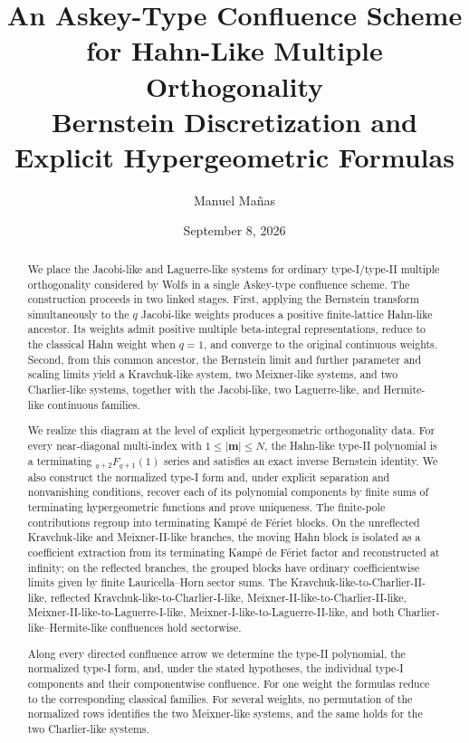 \documentclass[10pt]{amsart}
\title[An Askey-Type Hahn-Like Confluence Scheme]
{An Askey-Type Confluence Scheme for Hahn-Like Multiple Orthogonality\\[0.4ex]
	\mdseries\small Bernstein Discretization and Explicit Hypergeometric Formulas}
\author{Manuel Ma\~nas}
\date{September 8, 2026}
\newcommand{\mm}{\boldsymbol m}
\newcommand{\abs}[1]{\lvert#1\rvert}
\theoremstyle{plain}
\theoremstyle{definition}
\theoremstyle{remark}
\begin{document}
\begin{abstract}
We place the Jacobi-like and Laguerre-like systems for ordinary
type-I/type-II multiple orthogonality considered by Wolfs in a single
Askey-type confluence scheme. The construction proceeds in two linked
stages. First, applying the Bernstein transform simultaneously to the
\(q\) Jacobi-like weights produces a positive finite-lattice Hahn-like
ancestor. Its weights admit positive multiple beta-integral
representations, reduce to the classical Hahn weight when \(q=1\), and
converge to the original continuous weights. Second, from this common
ancestor, the Bernstein limit and further parameter and scaling limits yield a
Kravchuk-like system, two Meixner-like systems, and two Charlier-like
systems, together with the Jacobi-like, two Laguerre-like, and
Hermite-like continuous families.

We realize this diagram at the level of explicit hypergeometric
orthogonality data. For every near-diagonal multi-index with
\(1\le\abs\mm\le N\), the Hahn-like type-II polynomial is a terminating
\({}_{q+2}F_{q+1}(1)\) series and satisfies an exact inverse Bernstein
identity. We also construct the normalized type-I form and, under
explicit separation and nonvanishing conditions, recover each of its
polynomial components by finite sums of terminating hypergeometric
functions and prove uniqueness. The finite-pole contributions regroup
into terminating Kamp\'e de F\'eriet blocks. On the unreflected
Kravchuk-like and Meixner-II-like branches, the moving Hahn block is
isolated as a coefficient extraction from its terminating Kamp\'e de
F\'eriet factor and reconstructed at infinity; on the reflected branches,
the grouped blocks have ordinary coefficientwise limits given by finite
Lauricella--Horn sector sums. The
Kravchuk-like-to-Charlier-II-like,
reflected Kravchuk-like-to-Charlier-I-like,
Meixner-II-like-to-Charlier-II-like,
Meixner-II-like-to-Laguerre-I-like,
Meixner-I-like-to-Laguerre-II-like, and both
Charlier-like--Hermite-like confluences hold sectorwise.

Along every directed confluence arrow we determine the type-II polynomial, the
normalized type-I form, and, under the stated hypotheses, the individual
type-I components and their componentwise confluence. For one weight the
formulas reduce to the corresponding classical families. For several
weights, no permutation of the normalized rows identifies the two
Meixner-like systems, and the same holds for the two Charlier-like
systems.
\end{abstract}
\end{document}
